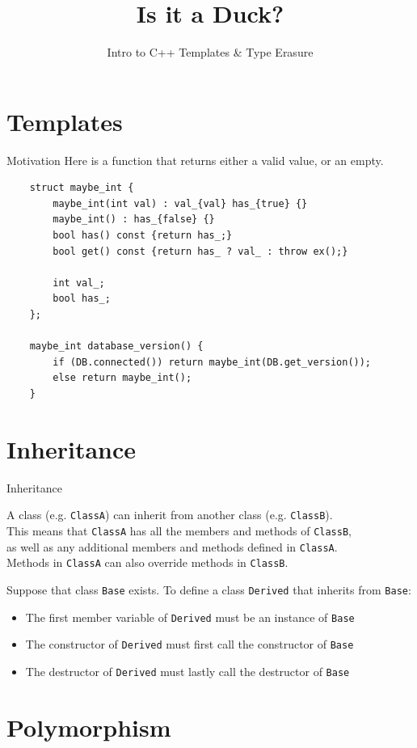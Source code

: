 

\title{Is it a Duck?}
\subtitle{Intro to C++ Templates \& Type Erasure}
\date{}



\maketitle

\section{Templates}

\begin{frame}[fragile]{Motivation}
  Here is a function that returns either a valid value, or an empty.


  \begin{verbatim}
    struct maybe_int {
        maybe_int(int val) : val_{val} has_{true} {}
        maybe_int() : has_{false} {}
        bool has() const {return has_;}
        bool get() const {return has_ ? val_ : throw ex();}

        int val_;
        bool has_;
    };

    maybe_int database_version() {
        if (DB.connected()) return maybe_int(DB.get_version());
        else return maybe_int();
    }
  \end{verbatim}
\end{frame}

\section{Inheritance}
\begin{frame}[fragile]{Inheritance}
  \begin{sqt:definition}
    A class (e.g. \verb|ClassA|) can inherit from another class (e.g. \verb|ClassB|).\\
    This means that \verb|ClassA| has all the members and methods of \verb|ClassB|,\\
    as well as any additional members and methods defined in \verb|ClassA|.\\
    Methods in \verb|ClassA| can also override methods in \verb|ClassB|.
  \end{sqt:definition}

  Suppose that class \verb|Base| exists.
  To define a class \verb|Derived| that inherits from \verb|Base|:
  \begin{itemize}
    \item The first member variable of \verb|Derived| must be an instance of \verb|Base|
    \item The constructor of \verb|Derived| must first call the constructor of \verb|Base|
    \item The destructor of \verb|Derived| must lastly call the destructor of \verb|Base|
  \end{itemize}
\end{frame}

\section{Polymorphism}

